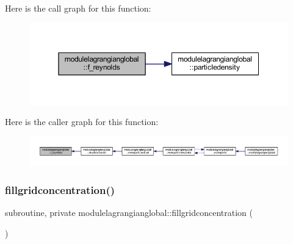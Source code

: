 Here is the call graph for this function\+:\nopagebreak
\begin{figure}[H]
\begin{center}
\leavevmode
\includegraphics[width=350pt]{namespacemodulelagrangianglobal_abb6d8c7acaf1915a70609c5d8763d229_cgraph}
\end{center}
\end{figure}
Here is the caller graph for this function\+:\nopagebreak
\begin{figure}[H]
\begin{center}
\leavevmode
\includegraphics[width=350pt]{namespacemodulelagrangianglobal_abb6d8c7acaf1915a70609c5d8763d229_icgraph}
\end{center}
\end{figure}
\mbox{\label{namespacemodulelagrangianglobal_ac90a060ac9ab05f2c54c45b4b76ca984}} 
\subsubsection{\texorpdfstring{fillgridconcentration()}{fillgridconcentration()}}
{\footnotesize\ttfamily subroutine, private modulelagrangianglobal\+::fillgridconcentration (\begin{DoxyParamCaption}{ }\end{DoxyParamCaption})\hspace{0.3cm}{\ttfamily [private]}}

